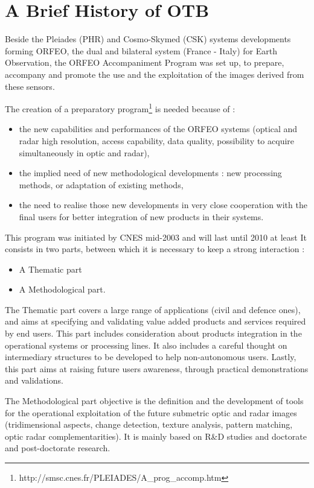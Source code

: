 \section{A Brief History of OTB}
\label{sec:History}



Beside the Pleiades (PHR) and Cosmo-Skymed (CSK) systems developments forming
ORFEO, the dual and bilateral system (France - Italy) for Earth Observation, the
ORFEO Accompaniment Program was set up, to prepare, accompany and promote the
use and the exploitation of the images derived from these sensors.

The creation of a preparatory
program\footnote{http://smsc.cnes.fr/PLEIADES/A\_prog\_accomp.htm} is needed
because of :
\begin{itemize}
\item the new capabilities and performances of the ORFEO systems (optical and
radar high resolution, access capability, data quality, possibility to acquire
simultaneously in optic and radar),
\item the implied need of new methodological developments : new processing
methods, or adaptation of existing methods,
\item the need to realise those new developments in very close
  cooperation with the final users for better integration of new products in
their systems.

\end{itemize}

This program was initiated by CNES mid-2003 and will last until 2010 at least
It consists in two parts, between which it is necessary to keep a strong
interaction :
\begin{itemize}
\item A Thematic part
\item A Methodological part.
\end{itemize}

The Thematic part covers a large range of applications (civil and
defence ones), and aims at specifying and validating value added
products and services required by end users. This part includes
consideration about products integration in the operational systems or
processing lines. It also includes a careful thought on intermediary
structures to be developed to help non-autonomous users. Lastly, this part aims
at raising future users awareness, through practical demonstrations and
validations.

The Methodological part objective is the definition and the
development of tools for the operational exploitation of the future
submetric optic and radar images (tridimensional aspects, change
detection, texture analysis, pattern matching, optic radar
complementarities). It is mainly based on R\&D studies and doctorate
and post-doctorate research.

